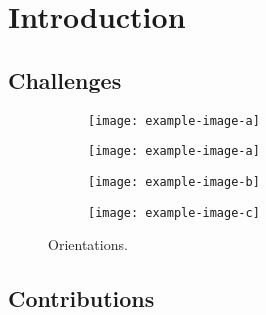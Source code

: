 \chapter{Introduction}

\section{Challenges}\label{section:challanges}
\begin{figure}[ht!]
	\centering
	\begin{subfigure}[ht!]{0.24\linewidth}
		\centering\texttt{[image: example-image-a]}
		\caption{\label{figure:parallel-horizontal-orientation}}
	\end{subfigure}%
	\hfill
	\centering
	\begin{subfigure}[ht!]{0.24\linewidth}
		\centering\texttt{[image: example-image-a]}
		\caption{\label{figure:parallel-vertical-orientation}}
	\end{subfigure}%
	\hfill
	\begin{subfigure}[ht!]{0.24\linewidth}
		\centering\texttt{[image: example-image-b]}
		\caption{\label{figure:oblique-orientation}}
	\end{subfigure}%
	\hfill
	\begin{subfigure}[ht!]{0.24\linewidth}
		\centering\texttt{[image: example-image-c]}
		\caption{\label{figure:perpendicular-orientation}}
	\end{subfigure}
	\caption{Orientations.}
\end{figure}

\section{Contributions}
